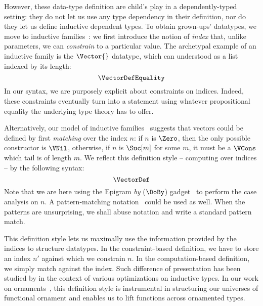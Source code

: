 \documentclass{scrartcl}
\theoremstyle{plain}
\theoremstyle{definition}
\begin{document}
However, these data-type definition are child's play in a
dependently-typed setting: they do not let us use any type dependency
in their definition, nor do they let us define inductive dependent 
types. To obtain grown-ups' datatypes, we move to inductive
families~\citep{dybjer:inductive-families}: we first introduce the notion of
\emph{index} that, unlike parameters, we can \emph{constrain} to a
particular value. The archetypal example of an inductive family is the
\(\Vector{}\) datatype, which can understood as a list indexed by its
length:
\[
\VectorDefEquality
\]
In our syntax, we are purposely explicit about constraints on
indices. Indeed, these constraints eventually turn into a statement
using whatever propositional equality the underlying type theory has
to offer.




Alternatively, our model of inductive families~\citep{alti:lics09}
suggests that vectors could be defined by first \emph{matching} over
the index \(n\): if \(n\) is \(\Zero\), then the only possible
constructor is \(\VNil\), otherwise, if \(n\) is \(\Suc[m]\) for some
\(m\), it must be a \(\VCons\) which tail is of length \(m\). We
reflect this definition style -- computing over indices -- by the
following syntax:
\[
\VectorDef
\]
Note that we are here using the Epigram \emph{by} (\(\DoBy\))
gadget~\citep{mcbride.mckinna:view-from-the-left} to perform the case
analysis on \(n\). A pattern-matching
notation~\citep{coquand:pattern-matching,sozeau:equations} could be
used as well. When the patterns are unsurprising, we shall abuse
notation and write a standard pattern match.

This definition style lets us maximally use the information provided
by the indices to structure datatypes. In the constraint-based
definition, we have to store an index \(n'\) against which we
constrain \(n\). In the computation-based definition, we simply match
against the index. Such difference of presentation has been studied by
\citet{brady:index-inductive-families} in the context of various
optimizations on inductive types. In our work on
ornaments~\citep{mcbride:ornament,dagand:fun-orn}, this definition
style is instrumental in structuring our universes of functional
ornament and enables us to lift functions across ornamented types.
\end{document}
